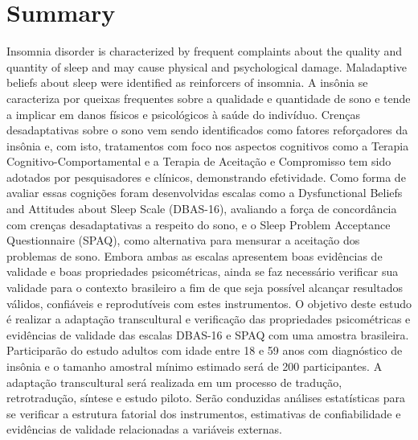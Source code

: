 \documentclass[
  ,doc,11pt, twoside,floatsintext]{apa6}
\begin{document}
\newpage

\begin{flushleft}
{
\tableofcontents
}
\end{flushleft}

\newpage

\thispagestyle{empty}

\hypertarget{summary}{%
\section{Summary}\label{summary}}

Insomnia disorder is characterized by frequent complaints about the quality and quantity of sleep and may cause physical and psychological damage. Maladaptive beliefs about sleep were identified as reinforcers of insomnia. A insônia se caracteriza por queixas frequentes sobre a qualidade e quantidade de sono e tende a implicar em danos físicos e psicológicos à saúde do indivíduo. Crenças desadaptativas sobre o sono vem sendo identificados como fatores reforçadores da insônia e, com isto, tratamentos com foco nos aspectos cognitivos como a Terapia Cognitivo-Comportamental e a Terapia de Aceitação e Compromisso tem sido adotados por pesquisadores e clínicos, demonstrando efetividade. Como forma de avaliar essas cognições foram desenvolvidas escalas como a Dysfunctional Beliefs and Attitudes about Sleep Scale (DBAS-16), avaliando a força de concordância com crenças desadaptativas a respeito do sono, e o Sleep Problem Acceptance Questionnaire (SPAQ), como alternativa para mensurar a aceitação dos problemas de sono. Embora ambas as escalas apresentem boas evidências de validade e boas propriedades psicométricas, ainda se faz necessário verificar sua validade para o contexto brasileiro a fim de que seja possível alcançar resultados válidos, confiáveis e reprodutíveis com estes instrumentos. O objetivo deste estudo é realizar a adaptação transcultural e verificação das propriedades psicométricas e evidências de validade das escalas DBAS-16 e SPAQ com uma amostra brasileira. Participarão do estudo adultos com idade entre 18 e 59 anos com diagnóstico de insônia e o tamanho amostral mínimo estimado será de 200 participantes. A adaptação transcultural será realizada em um processo de tradução, retrotradução, síntese e estudo piloto. Serão conduzidas análises estatísticas para se verificar a estrutura fatorial dos instrumentos, estimativas de confiabilidade e evidências de validade relacionadas a variáveis externas.

\newpage
\end{document}

